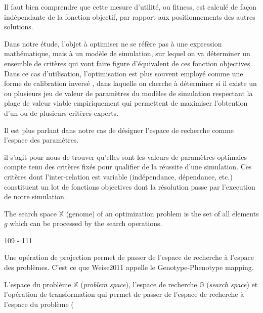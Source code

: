 
Il faut bien comprendre que cette mesure d'utilité, ou fitness, est calculé de façon indépendante de la fonction objectif, par rapport aux positionnements des autres solutions.



Dans notre étude, l'objet à optimiser ne se réfère pas à une expression mathématique, mais à un modèle de simulation, sur lequel on va déterminer un ensemble de critères qui vont faire figure d'équivalent de ces fonction objectives. Dans ce cas d'utilisation, l'optimisation est plus souvent employé comme une forme de calibration inversé \autocite{Grimm2011}, dans laquelle on cherche à déterminer si il existe un ou plusieurs jeu de valeur de paramètres du modèles de simulation respectant la plage de valeur viable empiriquement qui permettent de maximiser l'obtention d'un ou de plusieurs critères experts. 


Il est plus parlant dans notre cas de désigner l'espace de recherche comme l'espace des paramètres.  

 il s'agit pour nous de trouver qu'elles sont les valeurs de paramètres optimales compte tenu des critères fixés pour qualifier de la réussite d'une simulation. Ces critères dont l'inter-relation est variable (indépendance, dépendance, etc.) constituent un lot de fonctions objectives dont la résolution passe par l'execution de notre simulation.

The search space $\mathbb{X}$ (genome) of an optimization problem is the set of all elements $g$ which can be processed by the search operations.

109 - 111

Une opération de projection permet de passer de l'espace de recherche à l'espace des problèmes. C'est ce que Weise2011 appelle le Genotype-Phenotype mapping. 


L'espace du problème $\mathbb{X}$ (\textit{problem space}), l'espace de recherche $\mathbb{G}$ (\textit{search space}) et l'opération de transformation qui permet de passer de l'espace de recherche à l'espace du problème (

